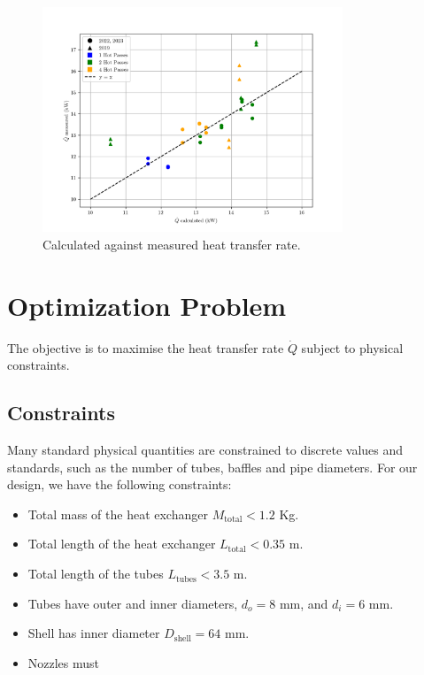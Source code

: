 \documentclass{article}
\begin{document}
\begin{figure}[H]
  \centering
  \includegraphics[width=0.8\textwidth]{Qdot_ccalc_vs_measured.png}
  \caption{Calculated against measured heat transfer rate.}
\end{figure}

\section{Optimization Problem}

The objective is to maximise the heat transfer rate $\dot{Q}$ subject to physical constraints.

\subsection{Constraints}

Many standard physical quantities are constrained to discrete values and standards, such as the number of tubes, baffles and pipe diameters.
For our design, we have the following constraints:
\begin{itemize}
  \item Total mass of the heat exchanger $M_{\text{total}} < 1.2$ Kg.
  \item Total length of the heat exchanger $L_{\text{total}} < 0.35$ m.
  \item Total length of the tubes $L_{\text{tubes}} < 3.5$ m.
  \item Tubes have outer and inner diameters, $d_{o} = 8$ mm, and $d_{i} = 6$ mm.
  \item Shell has inner diameter $D_{\text{shell}} = 64$ mm.
  \item Nozzles must 
\end{itemize}
\end{document}
